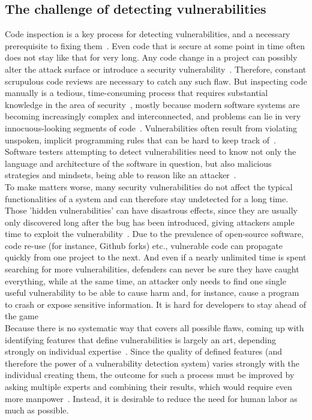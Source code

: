 \documentclass[
a4paper,
pagesize,
pdftex,
12pt,
twoside, %
BCOR=5mm, %
ngerman,
fleqn,
final,
]{scrartcl}
\begin{document}
	\subsection{The challenge of detecting vulnerabilities}
	Code inspection is a key process for detecting vulnerabilities, and a necessary prerequisite to fixing them~\cite{Yu.2019}. Even code that is secure at some point in time often does not stay like that for very long. Any code change in a project can possibly alter the attack surface or introduce a security vulnerability~\cite{Morrison.2015}. Therefore, constant scrupulous code reviews are necessary to catch any such flaw. But inspecting code manually is a tedious, time-consuming process that requires substantial knowledge in the area of security~\cite{Yamaguchi.2011}, mostly because modern software systems are becoming increasingly complex and interconnected, and problems can lie in very innocuous-looking segments of code~\cite{Pang.2015, Li.2018}. Vulnerabilities often result from violating unspoken, implicit programming rules that can be hard to keep track of~\cite{Li.2005}. Software testers attempting to detect vulnerabilities need to know not only the language and architecture of the software in question, but also malicious strategies and mindsets, being able to reason like an attacker~\cite{Pang.2015}.\\
	To make matters worse, many security vulnerabilities do not affect the typical functionalities of a system and can therefore stay undetected for a long time. Those 'hidden vulnerabilities' can have disastrous effects, since they are usually only discovered long after the bug has been introduced, giving attackers ample time to exploit the vulnerability~\cite{Wijayasekara.2012,Ma.2017,Russell.2018}. Due to the prevalence of open-source software, code re-use (for instance, Github forks) etc., vulnerable code can propagate quickly from one project to the next. And even if a nearly unlimited time is spent searching for more vulnerabilities, defenders can never be sure they have caught everything, while at the same time, an attacker only needs to find one single useful vulnerability to be able to cause harm and, for instance, cause a program to crash or expose sensitive information. It is hard for developers to stay ahead of the game\\	
	Because there is no systematic way that covers all possible flaws, coming up with identifying features that define vulnerabilities is largely an art, depending strongly on individual expertise~\cite{Rolim.2018,Li.2018}. Since the quality of defined features (and therefore the power of a vulnerability detection system) varies strongly with the individual creating them, the outcome for such a process must be improved by asking multiple experts and combining their results, which would require even more manpower~\cite{Li.2018}. Instead, it is desirable to reduce the need for human labor as much as possible.\\
\end{document}
